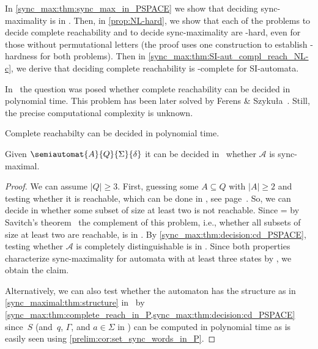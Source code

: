 

In \cref{sync_max:thm:sync_max_in_PSPACE} we show that deciding
sync-maximality is in \PSPACE.
Then, in \cref{prop:NL-hard}, we show
that each of the problems to decide complete reachability
and to decide sync-maximality are \NL-hard, even for those
without permutational letters (the proof uses one construction to establish \NL-hardness for both problems).
Then in \cref{sync_max:thm:SI-aut_compl_reach_NL-c},
we derive that deciding complete reachability is \NL-complete
for SI-automata.

In~\cite{BondarV16} the question was posed
whether complete reachability can be decided in polynomial time.
This problem has been later solved by Ferens \& Szyku\l a~\cite{DBLP:conf/icalp/FerensS23}.
Still, the precise computational complexity is unknown.

\begin{theorem}
	\label{sync_max:thm:complete_reach_in_P}
	Complete reachabilty can be decided in polynomial time.
\end{theorem}

\begin{theorem} \label{sync_max:thm:sync_max_in_PSPACE}
	Given $\semiautomat{A}{Q}{\Sigma}{\delta}$
	it can be decided in \PSPACE\  whether $\mathcal A$ is sync-maximal.
\end{theorem}
\begin{proof}
	We can assume $|Q| \ge 3$.
	First, guessing some $A \subseteq Q$
	with $|A| \ge 2$
	and testing whether it is reachable,
	which can be done in \PSPACE, see page~\pageref{reach-pspace}.
	So, we can decide in \NPSPACE
	whether some subset of size at least two is not reachable.
	Since \NPSPACE = \PSPACE 
	by Savitch's theorem~\cite{DBLP:journals/jcss/Savitch70}
	the complement of this problem, i.e., whether
	all subsets of size at least two are reachable,
	is in \PSPACE.
	By \cref{sync_max:thm:decision:cd_PSPACE},
	testing whether $\mathcal A$
	is completely distinguishable 
	is in \PSPACE.
	Since both properties characterize
	sync-maximality
	for automata with at least three states
	by ,
	we obtain the claim.
	
	Alternatively, we can also test whether the automaton
	has the structure as in \cref{sync_maximal:thm:structure}
	in \PSPACE\ by \cref{sync_max:thm:complete_reach_in_P,sync_max:thm:decision:cd_PSPACE}
	since~$S$ (and~$q$, $\Gamma$, and $a \in \Sigma$ in  )
	can be computed in polynomial time as is easily seen using \cref{prelim:cor:set_sync_words_in_P}.	
\end{proof} 

